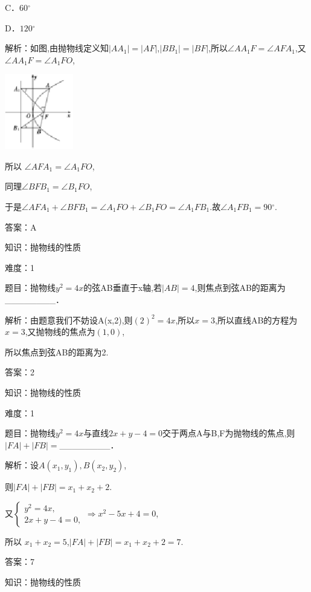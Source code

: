 \documentclass{article} %
\begin{document}
C．$60{{}^\circ}$ 

D．$120{{}^\circ}$

解析：如图,由抛物线定义知$|AA_{1}|=|AF|$,$|BB_{1}|=|BF|$,所以${\angle}AA_{1}F={\angle}AFA_{1}$,又${\angle}AA_{1}F={\angle}A_{1}FO$,

\includegraphics*[width=1.18in, height=1.29in, keepaspectratio=false]{image7}

所以 ${\angle}AFA_{1}={\angle}A_{1}FO$,

同理${\angle}BFB_{1}={\angle}B_{1}FO$,

于是${\angle}AFA_{1}+{\angle}BFB_{1}={\angle}A_{1}FO+{\angle}B_{1}FO={\angle}A_{1}FB_{1}$.故${\angle}A_{1}FB_{1}=90{{}^\circ}$.

答案：A



知识：抛物线的性质

难度：1

题目：抛物线$y^{2}=4x$的弦AB垂直于x轴,若$|AB|=4$,则焦点到弦AB的距离为\_\_\_\_\_\_\_\_．

解析：由题意我们不妨设A(x,2),则$(2)^{2}=4x$,所以$x=3$,所以直线AB的方程为$x=3$,又抛物线的焦点为$(1,0)$,

所以焦点到弦AB的距离为2.

答案：2



知识：抛物线的性质

难度：1

题目：抛物线$y^{2}=4x$与直线$2x+y-4=0$交于两点A与B,F为抛物线的焦点,则$|FA|+|FB|=$\_\_\_\_\_\_\_\_．

解析：设$A(x_{1},y_{1}),B(x_{2},y_{2})$,

则$|FA|+|FB|=x_{1}+x_{2}+2$.

又$
\begin{cases}
y^2=4x,\\
2x+y-4=0,
\end{cases}
\Rightarrow x^{2}-5x+4=0$,

所以 $x_{1}+x_{2}=5$,$|FA|+|FB|=x_{1}+x_{2}+2=7$.

答案：7



知识：抛物线的性质
\end{document}

